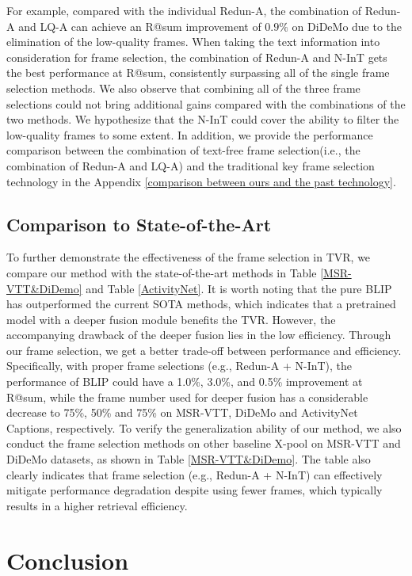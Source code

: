 \documentclass[11pt]{article}
\begin{document}
For example, compared with the individual Redun-A, the combination of Redun-A and LQ-A can achieve an R@sum improvement of $0.9\%$ on DiDeMo due to the elimination of the low-quality frames.
When taking the text information into consideration for frame selection, the combination of Redun-A and N-InT gets the best performance at R@sum, consistently surpassing all of the single frame selection methods.
We also observe that combining all of the three frame selections could not bring additional gains compared with the combinations of the two methods.
We hypothesize that the N-InT could cover the ability to filter the low-quality frames to some extent.
In addition, we provide the performance comparison between the combination of text-free frame selection(i.e., the combination of Redun-A and LQ-A) and the traditional key frame selection technology in the Appendix \ref{comparison between ours and the past technology}.

\subsection{Comparison to State-of-the-Art}
\label{comparison_to_sota}
To further demonstrate the effectiveness of the frame selection in TVR, we compare our method with the state-of-the-art methods in Table \ref{MSR-VTT&DiDemo} and Table \ref{ActivityNet}. 
It is worth noting that the pure BLIP has outperformed the current SOTA methods, which indicates that a pretrained model with a deeper fusion module benefits the TVR.
However, the accompanying drawback of the deeper fusion lies in the low efficiency.
Through our frame selection, we get a better trade-off between performance and efficiency.
Specifically, with proper frame selections (e.g., Redun-A + N-InT), the performance of BLIP could have a 1.0\%, 3.0\%, and 0.5\% improvement at R@sum, while the frame number used for deeper fusion has a considerable decrease to 75\%, 50\% and 75\% on MSR-VTT, DiDeMo and ActivityNet Captions, respectively.
To verify the generalization ability of our method, we also conduct the frame selection methods on other baseline X-pool \cite{gorti2022x} on MSR-VTT and DiDeMo datasets, as shown in Table \ref{MSR-VTT&DiDemo}.
The table also clearly indicates that frame selection (e.g., Redun-A + N-InT) can effectively mitigate performance degradation despite using fewer frames, which typically results in a higher retrieval efficiency.

\section{Conclusion}
\end{document}
